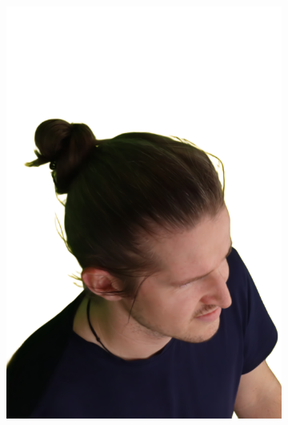 \begin{figure}
\begin{subfigure}{0.18\linewidth}
        \includegraphics[width=\textwidth]{Figures/results/splatfacto_ex/15_render.png}

\end{subfigure}
\end{figure}
